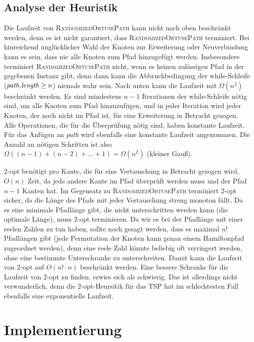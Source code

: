 \documentclass[a4paper, 10pt, ngerman]{article}
\begin{document}
\subsection{Analyse der Heuristik}

Die Laufzeit von \textsc{RandomizedObtusePath} kann nicht nach oben beschränkt werden, denn es ist nicht garantiert, dass \textsc{RandomizedObtusePath} terminiert. Bei hinreichend unglücklicher Wahl der Knoten zur Erweiterung oder Neuverbindung kann es sein, dass nie alle Knoten zum Pfad hinzugefügt werden. Insbesondere terminiert \textsc{RandomizedObtusePath} nicht, wenn es keinen zulässigen Pfad in der gegebenen Instanz gibt, denn dann kann die Abbruchbedingung der while-Schleife ($\emph{path.length} \ge n$) niemals wahr sein. Nach unten kann die Laufzeit mit $\Omega(n^2)$ beschränkt werden. Es sind mindestens $n - 1$ Iterationen der while-Schleife nötig sind, um alle Knoten zum Pfad hinzuzufügen, und in jeder Iteration wird jeder Knoten, der noch nicht im Pfad ist, für eine Erweiterung in Betracht gezogen. Alle Operationen, die für die Überprüfung nötig sind, haben konstante Laufzeit. Für das Anfügen an \emph{path} wird ebenfalls eine konstante Laufzeit angenommen. Die Anzahl an nötigen Schritten ist also $\Omega((n - 1) + (n - 2) + \dots + 1) = \Omega(n^2)$ (kleiner Gauß).

2-opt benötigt pro Kante, die für eine Vertauschung in Betracht gezogen wird, $O(n)$ Zeit, da jede andere Kante im Pfad überprüft werden muss und der Pfad $n - 1$ Kanten hat. Im Gegensatz zu \textsc{RandomizedObtusePath} terminiert 2-opt sicher, da die Länge des Pfads mit jeder Vertauschung streng monoton fällt. Da es eine minimale Pfadlänge gibt, die nicht unterschritten werden kann (die optimale Länge), muss 2-opt terminieren. Da wir es bei der Pfadlänge mit einer reelen Zahlen zu tun haben, sollte noch gesagt werden, dass es maximal $n!$ Pfadlängen gibt (jede Permutation der Knoten kann genau einem Hamiltonpfad zugeordnet werden), denn eine reele Zahl könnte beliebig oft verringert werden, ohne eine bestimmte Unterschranke zu unterschreiten. Damit kann die Laufzeit von 2-opt auf $O(n! \cdot n)$ beschränkt werden. Eine bessere Schranke für die Laufzeit von 2-opt zu finden, erwies sich als schwierig. Das ist allerdings nicht verwunderlich, denn die 2-opt-Heursitik für das TSP hat im schlechtesten Fall ebenfalls eine exponentielle Laufzeit.

\section{Implementierung}
\end{document}
